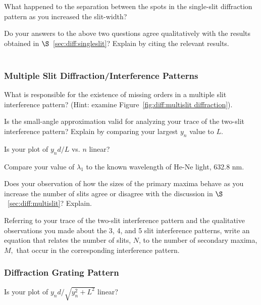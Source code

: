 \noindent
What happened to the separation between the spots in the single-slit
diffraction pattern as you increased the slit-width?
\vspace*{2cm}

\noindent
Do your answers to the above two questions agree qualitatively with
the results obtained in 
$\S$~\ref{sec:diff:singleslit}? Explain by citing the relevant results. \\
\vspace*{2cm} \\

\subsubsection{Multiple Slit Diffraction/Interference Patterns}
What is responsible for the existence of missing orders in a multiple
slit interference pattern? (Hint: examine 
Figure~\ref{fig:diff:multislit diffraction}).  
\vspace*{1.4cm} 

\noindent
Is the small-angle approximation valid for analyzing your trace of the
two-slit interference pattern? Explain by comparing your largest
$y_n$ value to $L.$
\vspace*{3cm}

\noindent
Is your plot of $y_nd/L$ vs. $n$ linear?
\vspace*{.3cm}

\noindent
Compare your value of $\lambda _1$ to the known wavelength of He-Ne
light, 632.8 nm.
\vspace*{2.5cm} 

\noindent
Does your observation of how the sizes of the primary maxima behave as
you increase the number of slits agree or disagree with the discussion
in $\S$~\ref{sec:diff:multislit}? Explain.
\vspace*{3cm}
  

\noindent
Referring to your trace of the two-slit interference pattern and the
qualitative observations you made about the 3, 4, and 5 slit
interference patterns, write an equation that relates the number of
slits, $N$, to the number of secondary maxima, $M,$ that occur in the
corresponding interference pattern. \\
\vspace*{2cm}


\subsubsection{Diffraction Grating Pattern}
Is your plot of $y_nd/ \sqrt{y_n^2 + L^2}$ linear?
\vspace*{.3cm}

